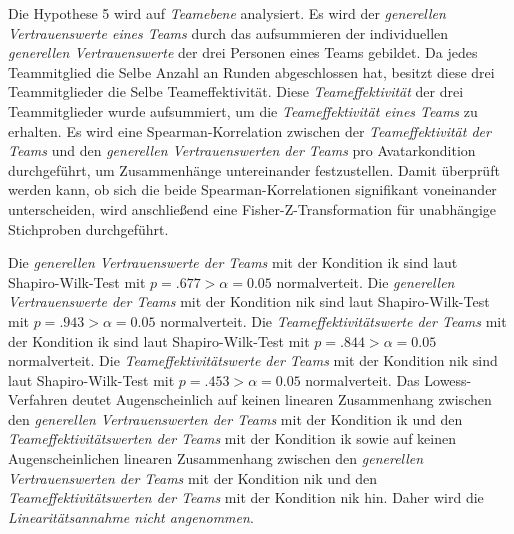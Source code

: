 \documentclass[a4paper,11pt]{article}%
\renewcommand{\\}{\vspace*{0.5\baselineskip} \newline}
\begin{document}
Die Hypothese 5 wird auf \textit{Teamebene} analysiert. Es wird der \textit{generellen Vertrauenswerte eines Teams} durch das aufsummieren der individuellen \textit{generellen Vertrauenswerte} der drei Personen eines Teams gebildet.
Da jedes Teammitglied die Selbe Anzahl an Runden abgeschlossen hat, besitzt diese drei Teammitglieder die Selbe Teameffektivität. Diese \textit{Teameffektivität} der drei Teammitglieder wurde aufsummiert, um die \textit{Teameffektivität eines Teams} zu erhalten.
Es wird eine Spearman-Korrelation zwischen der \textit{Teameffektivität der Teams} und den \textit{generellen Vertrauenswerten der Teams} pro Avatarkondition durchgeführt, um Zusammenhänge untereinander festzustellen.
Damit überprüft werden kann, ob sich die beide Spearman-Korrelationen signifikant voneinander unterscheiden, wird anschließend eine Fisher-Z-Transformation für unabhängige Stichproben durchgeführt.\\

Die \textit{generellen Vertrauenswerte der Teams} mit der Kondition \ac{ik} sind laut Shapiro-Wilk-Test mit $p = .677 > \alpha = 0.05$ normalverteit. \newline
Die \textit{generellen Vertrauenswerte der Teams} mit der Kondition \ac{nik} sind laut Shapiro-Wilk-Test mit $p = .943 > \alpha = 0.05$ normalverteit. \newline
Die \textit{Teameffektivitätswerte der Teams} mit der Kondition \ac{ik} sind laut Shapiro-Wilk-Test mit $p = .844 > \alpha = 0.05$ normalverteit. \newline
Die \textit{Teameffektivitätswerte der Teams} mit der Kondition \ac{nik} sind laut Shapiro-Wilk-Test mit $p = .453 > \alpha = 0.05$ normalverteit. \\
Das Lowess-Verfahren deutet Augenscheinlich auf keinen linearen Zusammenhang zwischen den \textit{generellen Vertrauenswerten der Teams} mit der Kondition \ac{ik} und den \textit{Teameffektivitätswerten der Teams} mit der Kondition \ac{ik} sowie auf keinen Augenscheinlichen linearen Zusammenhang zwischen den \textit{generellen Vertrauenswerten der Teams} mit der Kondition \ac{nik} und den \textit{Teameffektivitätswerten der Teams} mit der Kondition \ac{nik} hin. Daher wird die \textit{Linearitätsannahme nicht angenommen}.
\end{document}
